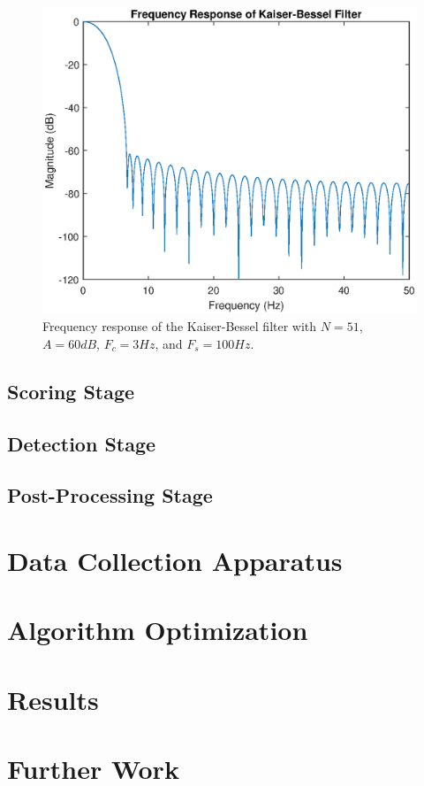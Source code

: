                 \begin{figure}[!th]
                    \includegraphics[width=\textwidth]{Images/kb_filter.eps}
                    \centering
                    \caption{Frequency response of the Kaiser-Bessel filter with $N=51$, $A=60dB$, $F_c = 3Hz$, and $F_s= 100Hz$.}
                    \label{img_kb_filter}
                \end{figure}  

        \section{Scoring Stage}

        \section{Detection Stage}

        \section{Post-Processing Stage}

    \chapter{Data Collection Apparatus}

    \chapter{Algorithm Optimization}

    \chapter{Results}

    \chapter{Further Work}
